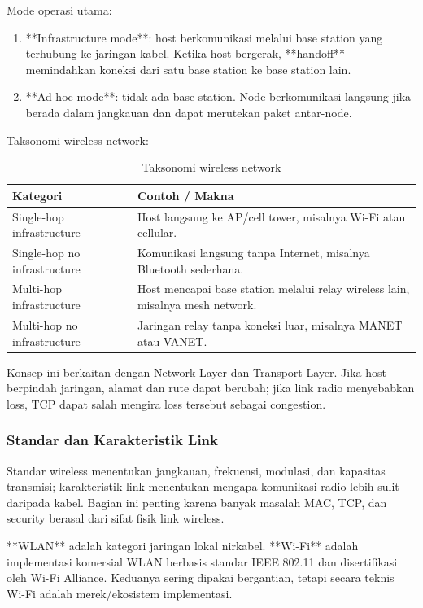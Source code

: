 Mode operasi utama:
\begin{enumerate}
    \item **Infrastructure mode**: host berkomunikasi melalui base station yang terhubung ke jaringan kabel. Ketika host bergerak, **handoff** memindahkan koneksi dari satu base station ke base station lain.
    \item **Ad hoc mode**: tidak ada base station. Node berkomunikasi langsung jika berada dalam jangkauan dan dapat merutekan paket antar-node.
\end{enumerate}

Taksonomi wireless network:
\begin{table}[H]
\centering
\begin{tabularx}{\textwidth}{|L{0.30\textwidth}|X|}
\hline
\textbf{Kategori} & \textbf{Contoh / Makna} \\
\hline
Single-hop infrastructure & Host langsung ke AP/cell tower, misalnya Wi-Fi atau cellular. \\
\hline
Single-hop no infrastructure & Komunikasi langsung tanpa Internet, misalnya Bluetooth sederhana. \\
\hline
Multi-hop infrastructure & Host mencapai base station melalui relay wireless lain, misalnya mesh network. \\
\hline
Multi-hop no infrastructure & Jaringan relay tanpa koneksi luar, misalnya MANET atau VANET. \\
\hline
\end{tabularx}
\caption{Taksonomi wireless network}
\label{tab:wireless-taxonomy}
\end{table}

Konsep ini berkaitan dengan Network Layer dan Transport Layer. Jika host berpindah jaringan, alamat dan rute dapat berubah; jika link radio menyebabkan loss, TCP dapat salah mengira loss tersebut sebagai congestion.

\subsubsection{Standar dan Karakteristik Link}
\begin{jawab}
Standar wireless menentukan jangkauan, frekuensi, modulasi, dan kapasitas transmisi; karakteristik link menentukan mengapa komunikasi radio lebih sulit daripada kabel. Bagian ini penting karena banyak masalah MAC, TCP, dan security berasal dari sifat fisik link wireless.
\end{jawab}

**WLAN** adalah kategori jaringan lokal nirkabel. **Wi-Fi** adalah implementasi komersial WLAN berbasis standar IEEE 802.11 dan disertifikasi oleh Wi-Fi Alliance. Keduanya sering dipakai bergantian, tetapi secara teknis Wi-Fi adalah merek/ekosistem implementasi.

